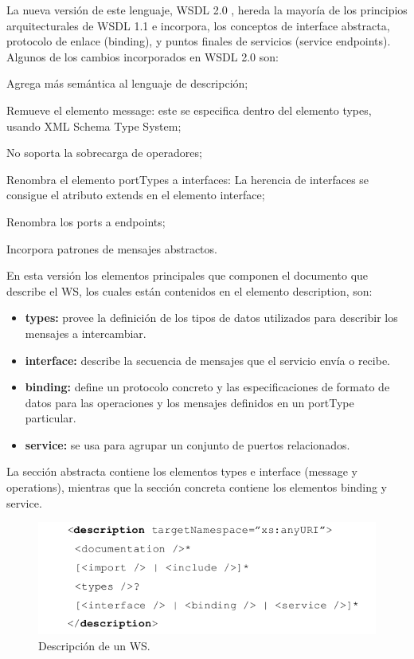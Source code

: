 La nueva versión de este lenguaje, WSDL 2.0 \cite{WSDL2.0-0}, hereda la mayoría de los principios arquitecturales de WSDL 1.1 e incorpora, los conceptos de interface abstracta, protocolo de enlace (binding), y puntos finales de servicios (service endpoints). Algunos de los cambios incorporados en WSDL 2.0 son:

Agrega más semántica al lenguaje de descripción;

Remueve el elemento message: este se especifica dentro del elemento types, usando XML Schema Type System;

No soporta la sobrecarga de operadores;

Renombra el elemento portTypes a interfaces: La herencia de interfaces se consigue el atributo extends en el elemento interface;

Renombra los ports a endpoints;

Incorpora patrones de mensajes abstractos.


En esta versión los elementos principales que componen el documento que describe el WS, los cuales están contenidos en el elemento description, son: 

\begin{itemize}
	\item \textbf{types:} provee la definición de los tipos de datos utilizados para describir los mensajes a intercambiar.
	\item \textbf{interface:} describe la secuencia de mensajes que el servicio envía o recibe.
	\item \textbf{binding:} define un protocolo concreto y las especificaciones de formato de datos para las operaciones y los mensajes definidos en un portType particular.
	\item \textbf{service:} se usa para agrupar un conjunto de puertos relacionados.
\end{itemize}

La sección abstracta contiene los elementos types e interface (message y operations), mientras que la sección concreta contiene los elementos binding y service.

\begin{figure}[!h] 
	\begin{center}
		\includegraphics [scale=0.70]{imagenes/descripcion_ws.png}
	\end{center}
	\caption{Descripción de un WS.}
	\label{fig:Descripción de un WS}
\end{figure} 

